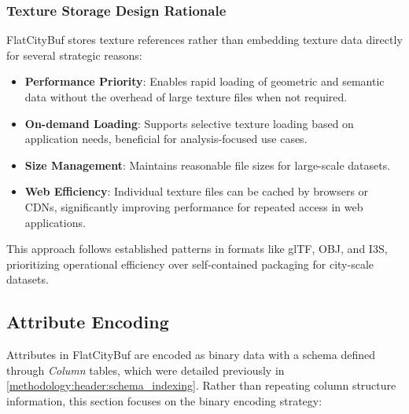 \subsubsection{Texture Storage Design Rationale}
\label{methodology:feature_encoding:textures:rationale}

FlatCityBuf stores texture references rather than embedding texture data directly for several strategic reasons:

\begin{itemize}
  \item \textbf{Performance Priority}: Enables rapid loading of geometric and semantic data without the overhead of large texture files when not required.

  \item \textbf{On-demand Loading}: Supports selective texture loading based on application needs, beneficial for analysis-focused use cases.

  \item \textbf{Size Management}: Maintains reasonable file sizes for large-scale datasets.

  \item \textbf{Web Efficiency}: Individual texture files can be cached by browsers or \ac{CDN}s, significantly improving performance for repeated access in web applications.
\end{itemize}

This approach follows established patterns in formats like glTF, OBJ, and I3S, prioritizing operational efficiency over self-contained packaging for city-scale datasets.

\subsection{Attribute Encoding}
\label{methodology:feature_encoding:attribute_encoding}

Attributes in FlatCityBuf are encoded as binary data with a schema defined through \textit{Column} tables, which were detailed previously in \autoref{methodology:header:schema_indexing}. Rather than repeating column structure information, this section focuses on the binary encoding strategy:


